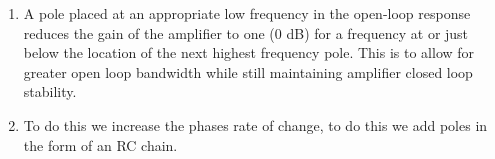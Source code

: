 \documentclass[11pt]{article}
\begin{document}
\begin{preview}
\begin{enumerate}[label=\roman*)]
        \item A pole placed at an appropriate low frequency in the open-loop response reduces the gain of the amplifier to one (0 dB) for a frequency at or just below the location of the next highest frequency pole. This is to allow  for greater open loop bandwidth while still maintaining amplifier closed loop stability.

        \item To do this we increase the phases rate of change, to do this we add poles in the form of an RC chain.
\end{enumerate}

\end{preview}
\end{document}
